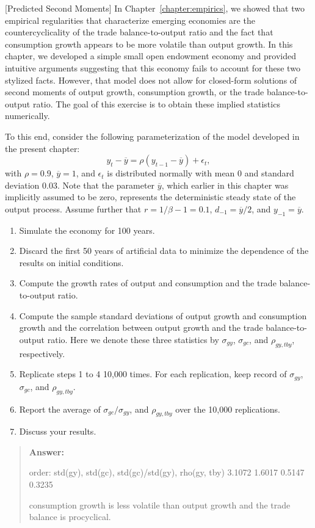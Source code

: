\begin{exercise}  \label{exercise:endowment_psm}
[Predicted Second Moments] In Chapter~\ref{chapter:empirics}, we showed that  two empirical regularities that characterize emerging economies are the countercyclicality of the trade balance-to-output ratio and the fact that consumption growth appears to be more volatile than output growth. In this chapter, we developed a simple  
 small open endowment economy and provided intuitive arguments suggesting that this economy fails to account for these two stylized facts. However, that model does not allow for closed-form solutions of second moments of output growth, consumption growth, or the trade balance-to-output ratio. 
The goal of this exercise is to obtain these implied statistics numerically. 

To this end, consider the following parameterization of the model developed in the present chapter: 
\[y_t - \overline{y} = \rho (y_{t-1} - \overline{y}) + \epsilon_t,
\]
with $\rho=0.9$, $\overline{y}=1$, and $\epsilon_t$ is distributed normally with mean 0 and standard deviation 0.03. Note that the parameter $\overline{y}$, which earlier in this chapter was implicitly assumed to be zero, represents the deterministic steady state of the output process. Assume further that   
$r=1/\beta-1=0.1$, $d_{-1}= \overline{y}/2$, and $y_{-1}=\overline{y}$.  
\begin{enumerate}
\item Simulate the economy for 100 years. 
\item Discard the first 50 years of artificial data to minimize the dependence of the results on initial conditions. 
\item Compute the growth rates of output and consumption and the trade balance-to-output ratio. 
\item Compute the sample standard deviations of output growth and consumption growth and the correlation between output growth and the trade balance-to-output ratio. Here we denote these three statistics by $\sigma_{gy}$, $\sigma_{gc}$, and $\rho_{gy,tby}$, respectively. 
\item Replicate steps 1 to 4 10,000 times. For each replication, keep record of $\sigma_{gy}$, $\sigma_{gc}$, and $\rho_{gy,tby}$. 
\item Report the average of  $\sigma_{gc}/\sigma_{gy}$, and $\rho_{gy,tby}$ over the 10,000 replications. 
\item Discuss your results.
\end{enumerate}
\begin{quote}
{\bf Answer: } 


order: std(gy), std(gc), std(gc)/std(gy), rho(gy, tby)
    3.1072
    1.6017
    0.5147
    0.3235

consumption growth is less volatile than output growth and the  trade balance is procyclical. 



\end{quote}

\end{exercise}

